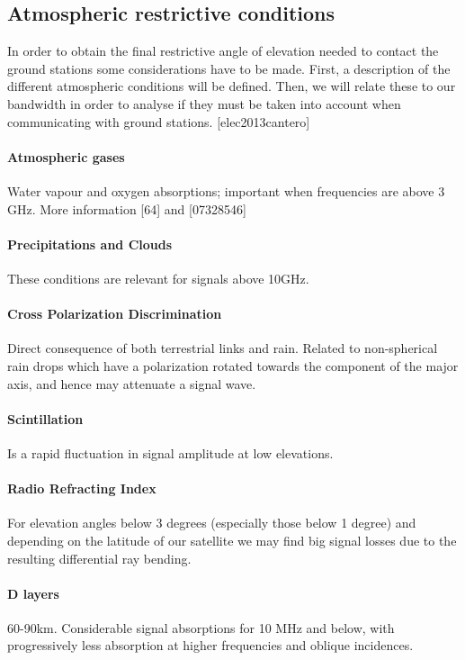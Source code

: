 \subsection{Atmospheric restrictive conditions}
In order to obtain the final restrictive angle of elevation needed to contact the ground stations some considerations have to be made. First, a description of the different atmospheric conditions will be defined. Then, we will relate these to our bandwidth in order to analyse if they must be taken into account when communicating with ground stations. [elec2013cantero]

\paragraph{Atmospheric gases} Water vapour and oxygen absorptions; important when frequencies are above 3 GHz. More information [64] and [07328546]

\paragraph{Precipitations and Clouds} These conditions are relevant for signals above 10GHz.

\paragraph{Cross Polarization Discrimination} Direct consequence of both terrestrial links and rain. Related to non-spherical rain drops which have a polarization rotated towards the component of the major axis, and hence may attenuate a signal wave.

\paragraph{Scintillation} Is a rapid fluctuation in signal amplitude at low elevations.

\paragraph{Radio Refracting Index} For elevation angles below 3 degrees (especially those below 1 degree) and depending on the latitude of our satellite we may find big signal losses due to the resulting differential ray bending.


\paragraph{D layers} 60-90km. Considerable signal absorptions for 10 MHz and below, with progressively less absorption at higher frequencies and oblique incidences.

